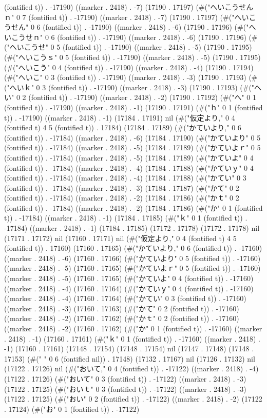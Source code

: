 (fontified t)) . -17190) ((marker . 2418) . -7) (17190 . 17197) (#("へいこうせんｎ" 0 7 (fontified t)) . -17190) ((marker . 2418) . -7) (17190 . 17197) (#("へいこうせん" 0 6 (fontified t)) . -17190) ((marker . 2418) . -6) (17190 . 17196) (#("へいこうせｎ" 0 6 (fontified t)) . -17190) ((marker . 2418) . -6) (17190 . 17196) (#("へいこうせ" 0 5 (fontified t)) . -17190) ((marker . 2418) . -5) (17190 . 17195) (#("へいこうｓ" 0 5 (fontified t)) . -17190) ((marker . 2418) . -5) (17190 . 17195) (#("へいこう" 0 4 (fontified t)) . -17190) ((marker . 2418) . -4) (17190 . 17194) (#("へいこ" 0 3 (fontified t)) . -17190) ((marker . 2418) . -3) (17190 . 17193) (#("へいｋ" 0 3 (fontified t)) . -17190) ((marker . 2418) . -3) (17190 . 17193) (#("へい" 0 2 (fontified t)) . -17190) ((marker . 2418) . -2) (17190 . 17192) (#("へ" 0 1 (fontified t)) . -17190) ((marker . 2418) . -1) (17190 . 17191) (#("ｈ" 0 1 (fontified t)) . -17190) ((marker . 2418) . -1) (17184 . 17191) nil (#("仮定より," 0 4 (fontified t) 4 5 (fontified t)) . 17184) (17184 . 17189) (#("かていより," 0 6 (fontified t)) . -17184) ((marker . 2418) . -6) (17184 . 17190) (#("かていより" 0 5 (fontified t)) . -17184) ((marker . 2418) . -5) (17184 . 17189) (#("かていよｒ" 0 5 (fontified t)) . -17184) ((marker . 2418) . -5) (17184 . 17189) (#("かていよ" 0 4 (fontified t)) . -17184) ((marker . 2418) . -4) (17184 . 17188) (#("かていｙ" 0 4 (fontified t)) . -17184) ((marker . 2418) . -4) (17184 . 17188) (#("かてい" 0 3 (fontified t)) . -17184) ((marker . 2418) . -3) (17184 . 17187) (#("かて" 0 2 (fontified t)) . -17184) ((marker . 2418) . -2) (17184 . 17186) (#("かｔ" 0 2 (fontified t)) . -17184) ((marker . 2418) . -2) (17184 . 17186) (#("か" 0 1 (fontified t)) . -17184) ((marker . 2418) . -1) (17184 . 17185) (#("ｋ" 0 1 (fontified t)) . -17184) ((marker . 2418) . -1) (17184 . 17185) (17172 . 17178) (17172 . 17178) nil (17171 . 17172) nil (17160 . 17171) nil (#("仮定より," 0 4 (fontified t) 4 5 (fontified t)) . 17160) (17160 . 17165) (#("かていより," 0 6 (fontified t)) . -17160) ((marker . 2418) . -6) (17160 . 17166) (#("かていより" 0 5 (fontified t)) . -17160) ((marker . 2418) . -5) (17160 . 17165) (#("かていよｒ" 0 5 (fontified t)) . -17160) ((marker . 2418) . -5) (17160 . 17165) (#("かていよ" 0 4 (fontified t)) . -17160) ((marker . 2418) . -4) (17160 . 17164) (#("かていｙ" 0 4 (fontified t)) . -17160) ((marker . 2418) . -4) (17160 . 17164) (#("かてい" 0 3 (fontified t)) . -17160) ((marker . 2418) . -3) (17160 . 17163) (#("かて" 0 2 (fontified t)) . -17160) ((marker . 2418) . -2) (17160 . 17162) (#("かｔ" 0 2 (fontified t)) . -17160) ((marker . 2418) . -2) (17160 . 17162) (#("か" 0 1 (fontified t)) . -17160) ((marker . 2418) . -1) (17160 . 17161) (#("ｋ" 0 1 (fontified t)) . -17160) ((marker . 2418) . -1) (17160 . 17161) (17148 . 17154) (17148 . 17154) nil (17147 . 17148) (17148 . 17153) (#("		    " 0 6 (fontified nil)) . 17148) (17132 . 17167) nil (17126 . 17132) nil (17122 . 17126) nil (#("おいて," 0 4 (fontified t)) . -17122) ((marker . 2418) . -4) (17122 . 17126) (#("おいて" 0 3 (fontified t)) . -17122) ((marker . 2418) . -3) (17122 . 17125) (#("おいｔ" 0 3 (fontified t)) . -17122) ((marker . 2418) . -3) (17122 . 17125) (#("おい" 0 2 (fontified t)) . -17122) ((marker . 2418) . -2) (17122 . 17124) (#("お" 0 1 (fontified t)) . -17122) 
